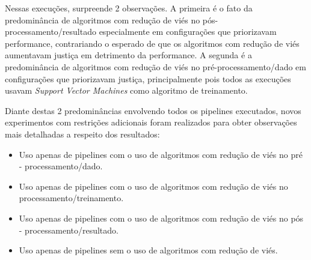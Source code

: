 \documentclass[portugues]{ic-tese}
\begin{document}
\begin{table}[H]
\begin{center}
  \caption{Melhores opções escolhidas pelo modelo MAPE-K \\ Todos os métodos - 25\% Performance/75\% Fairness}
\label{tbl:ScoreMAPEKGeral2575}
\end{center}
\end{table}

Nessas execuções, surpreende 2 observações. A primeira é o fato da predominância de algoritmos com redução de viés no pós-processamento/resultado especialmente em configurações que priorizavam performance, contrariando o esperado de que os algoritmos com redução de viés aumentavam justiça em detrimento da performance. A segunda é a predominância de algoritmos com redução de viés no pré-processamento/dado em configurações que priorizavam justiça, principalmente pois todos as execuções usavam \textit{Support Vector Machines} como algoritmo de treinamento.

Diante destas 2 predominâncias envolvendo todos os pipelines executados, novos experimentos com restrições adicionais foram realizados para obter observações mais detalhadas a respeito dos resultados:

\begin{itemize}
\item Uso apenas de pipelines com o uso de algoritmos com redução de viés no pré - processamento/dado.
\item Uso apenas de pipelines com o uso de algoritmos com redução de viés no processamento/treinamento.
\item Uso apenas de pipelines com o uso de algoritmos com redução de viés no pós - processamento/resultado.
\item Uso apenas de pipelines sem o uso de algoritmos com redução de viés.
\end{itemize}
\end{document}
